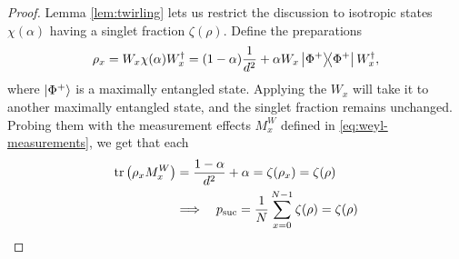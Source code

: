     \singletfraction*
    \begin{proof}
        Lemma \ref{lem:twirling} lets us restrict the discussion to isotropic states $\chi(\alpha)$ having a singlet fraction $\zeta(\rho)$. Define the preparations
        $$
            \rho_x = W_x \chi(\alpha) W_x^\dagger = (1 - \alpha) \frac{1}{d^2} + \alpha W_x \ketbra{\Phi^+}{\Phi^+} W_x^\dagger ,
        $$
        where $\ket{\Phi^+}$ is a maximally entangled state. Applying the $W_x$ will take it to another maximally entangled state, and the singlet fraction remains unchanged. Probing them with the measurement effects $M^W_x$ defined in \eqref{eq:weyl-measurements}, we get that each
        \begin{align*}
            \text{tr}\left( \rho_x M^W_x \right) &= \frac{1 - \alpha}{d^2} + \alpha = \zeta(\rho_x) = \zeta(\rho) \\
            &\Longrightarrow\quad p_{\text{suc}} = \frac{1}{N} \sum_{x=0}^{N-1} \zeta(\rho) = \zeta(\rho)
        \end{align*}
    \end{proof}


